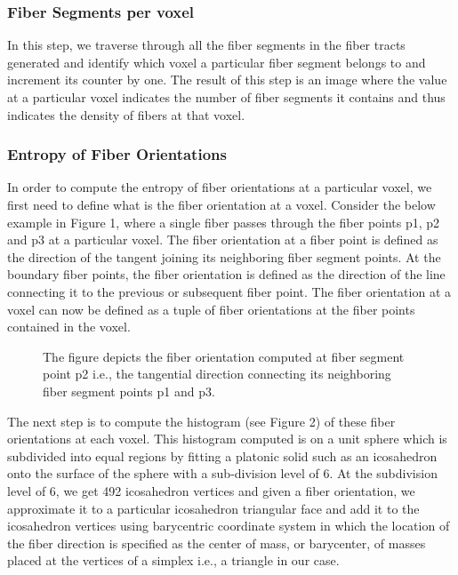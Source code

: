 \documentclass{llncs}
\begin{document}
%
\subsubsection{Fiber Segments per voxel}
%
In this step, we traverse through all the fiber segments in the fiber tracts generated and 
identify which voxel a particular fiber segment belongs to and increment its counter by one. 
The result of this step is an image where the value at a particular voxel indicates the number
of fiber segments it contains and thus indicates the density of fibers at that voxel.

%
\subsubsection{Entropy of Fiber Orientations}
%
In order to compute the entropy of fiber orientations at a particular voxel, we first need to define
what is the fiber orientation at a voxel. Consider the below example in Figure 1, where a single fiber 
passes through the fiber points p1, p2 and p3 at a particular voxel. The fiber orientation at a
fiber point is defined as the direction of the tangent joining its neighboring fiber segment points. At
the boundary fiber points, the fiber orientation is defined as the direction of the line connecting it to the previous
or subsequent fiber point. The fiber orientation at a voxel can now be defined as a tuple of fiber orientations at 
the fiber points contained in the voxel.

\begin{figure}
\centering
{}
\caption{The figure depicts the fiber orientation computed at fiber segment point p2 i.e., the tangential
direction connecting its neighboring fiber segment points p1 and p3.}
\end{figure}
%
The next step is to compute the histogram (see Figure 2) of these fiber orientations at each voxel. This histogram computed
is on a unit sphere which is subdivided into equal regions by fitting a platonic solid such as an icosahedron onto
the surface of the sphere with a sub-division level of 6.  At the subdivision level of 6, we get 492 icosahedron 
vertices and given a fiber orientation, we approximate it to a particular icosahedron triangular face and add it to the 
icosahedron vertices using barycentric coordinate system in which the location of the fiber direction is specified 
as the center of mass, or barycenter, of masses placed at the vertices of a simplex i.e., a triangle in our case.
\end{document}
